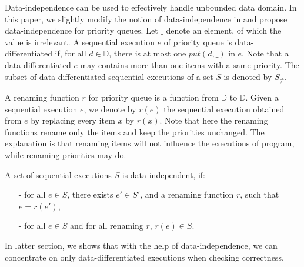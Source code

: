 Data-independence \cite{Wolper:1986} can be used to effectively handle unbounded data domain. In this paper, we slightly modify the notion of data-independence in \cite{Wolper:1986} and propose data-independence for priority queues. Let $\_$ denote an element, of which the value is irrelevant. A sequential execution $e$ of priority queue is data-differentiated if, for all $d \in \mathbb{D}$, there is at most one $\textit{put}(d,\_)$ in $e$. Note that a data-differentiated $e$ may contains more than one items with a same priority. The subset of data-differentiated sequential executions of a set $S$ is denoted by $S_{\neq}$. 

A renaming function $r$ for priority queue is a function from $\mathbb{D}$ to $\mathbb{D}$. Given a sequential execution $e$, we denote by $r(e)$ the sequential execution obtained from $e$ by replacing every item $x$ by $r(x)$. Note that here the renaming functions rename only the items and keep the priorities unchanged. The explanation is that renaming items will not influence the executions of program, while renaming priorities may do.

\begin{definition}\label{def:priority-value data-independence}
A set of sequential executions $S$ is data-independent, if:
\begin{itemize}
\setlength{\itemsep}{0.5pt}
\item[-] for all $e \in S$, there exists $e' \in S'$, and a renaming function $r$, such that $e=r(e')$,

\item[-] for all $e \in S$ and for all renaming $r$, $r(e) \in S$.
\end{itemize}
\end{definition} 

In latter section, we shows that with the help of data-independence, we can concentrate on only data-differentiated executions when checking correctness.


